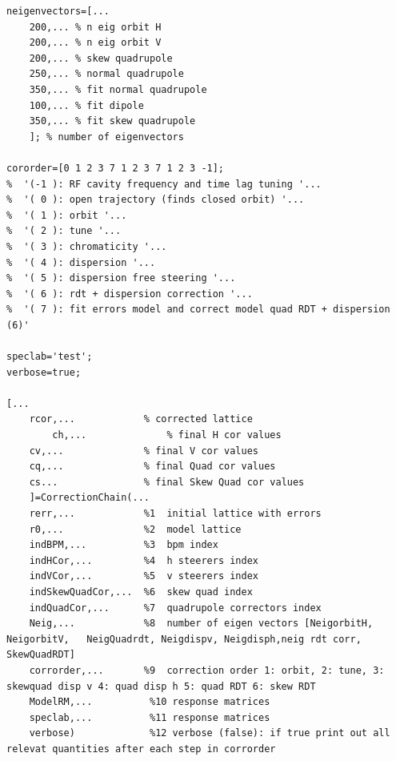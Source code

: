 \begin{lstlisting}
neigenvectors=[...
    200,... % n eig orbit H
    200,... % n eig orbit V
    200,... % skew quadrupole 
    250,... % normal quadrupole 
    350,... % fit normal quadrupole 
    100,... % fit dipole 
    350,... % fit skew quadrupole 
    ]; % number of eigenvectors 

cororder=[0 1 2 3 7 1 2 3 7 1 2 3 -1];
%  '(-1 ): RF cavity frequency and time lag tuning '...
%  '( 0 ): open trajectory (finds closed orbit) '...
%  '( 1 ): orbit '...
%  '( 2 ): tune '...
%  '( 3 ): chromaticity '...
%  '( 4 ): dispersion '...
%  '( 5 ): dispersion free steering '...
%  '( 6 ): rdt + dispersion correction '...
%  '( 7 ): fit errors model and correct model quad RDT + dispersion (6)'

speclab='test';
verbose=true;

[...
    rcor,...            % corrected lattice
		ch,...              % final H cor values
    cv,...              % final V cor values
    cq,...              % final Quad cor values
    cs...               % final Skew Quad cor values
    ]=CorrectionChain(...
    rerr,...            %1  initial lattice with errors
    r0,...              %2  model lattice
    indBPM,...          %3  bpm index
    indHCor,...         %4  h steerers index
    indVCor,...         %5  v steerers index
    indSkewQuadCor,...  %6  skew quad index
    indQuadCor,...      %7  quadrupole correctors index
    Neig,...            %8  number of eigen vectors [NeigorbitH, NeigorbitV,   NeigQuadrdt, Neigdispv, Neigdisph,neig rdt corr, SkewQuadRDT]
    corrorder,...       %9  correction order 1: orbit, 2: tune, 3: skewquad disp v 4: quad disp h 5: quad RDT 6: skew RDT
    ModelRM,...          %10 response matrices
    speclab,...          %11 response matrices
    verbose)             %12 verbose (false): if true print out all relevat quantities after each step in corrorder



\end{lstlisting}

\newpage
